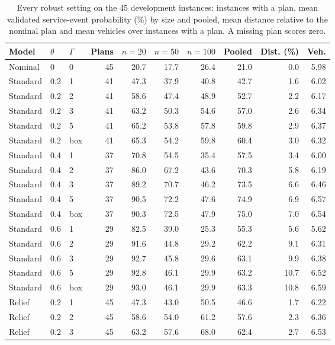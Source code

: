 \begin{table}[htbp]
\centering
\scriptsize
\caption{Every robust setting on the 45 development instances: instances with a plan, mean validated service-event probability (\%) by size and pooled, mean distance relative to the nominal plan and mean vehicles over instances with a plan. A missing plan scores zero.}
\label{tab:robust-grid}
\begin{tabular}{@{}lllrrrrrrr@{}}
\toprule
Model & $\theta$ & $\Gamma$ & Plans & $n=20$ & $n=50$ & $n=100$ & Pooled & Dist. (\%) & Veh.\\
\midrule
Nominal & 0 & 0 & 45 & 20.7 & 17.7 & 26.4 & 21.0 & 0.0 & 5.98\\
Standard & 0.2 & 1 & 41 & 47.3 & 37.9 & 40.8 & 42.7 & 1.6 & 6.02\\
Standard & 0.2 & 2 & 41 & 58.6 & 47.4 & 48.9 & 52.7 & 2.2 & 6.17\\
Standard & 0.2 & 3 & 41 & 63.2 & 50.3 & 54.6 & 57.0 & 2.6 & 6.34\\
Standard & 0.2 & 5 & 41 & 65.2 & 53.8 & 57.8 & 59.8 & 2.9 & 6.37\\
Standard & 0.2 & box & 41 & 65.3 & 54.2 & 59.8 & 60.4 & 3.0 & 6.32\\
Standard & 0.4 & 1 & 37 & 70.8 & 54.5 & 35.4 & 57.5 & 3.4 & 6.00\\
Standard & 0.4 & 2 & 37 & 86.0 & 67.2 & 43.6 & 70.3 & 5.8 & 6.19\\
Standard & 0.4 & 3 & 37 & 89.2 & 70.7 & 46.2 & 73.5 & 6.6 & 6.46\\
Standard & 0.4 & 5 & 37 & 90.5 & 72.2 & 47.6 & 74.9 & 6.9 & 6.57\\
Standard & 0.4 & box & 37 & 90.3 & 72.5 & 47.9 & 75.0 & 7.0 & 6.54\\
Standard & 0.6 & 1 & 29 & 82.5 & 39.0 & 25.3 & 55.3 & 5.6 & 5.62\\
Standard & 0.6 & 2 & 29 & 91.6 & 44.8 & 29.2 & 62.2 & 9.1 & 6.31\\
Standard & 0.6 & 3 & 29 & 92.7 & 45.8 & 29.6 & 63.1 & 9.9 & 6.38\\
Standard & 0.6 & 5 & 29 & 92.8 & 46.1 & 29.9 & 63.2 & 10.7 & 6.52\\
Standard & 0.6 & box & 29 & 93.0 & 46.1 & 29.9 & 63.3 & 10.8 & 6.59\\
Relief & 0.2 & 1 & 45 & 47.3 & 43.0 & 50.5 & 46.6 & 1.7 & 6.22\\
Relief & 0.2 & 2 & 45 & 58.6 & 54.0 & 61.2 & 57.6 & 2.3 & 6.36\\
Relief & 0.2 & 3 & 45 & 63.2 & 57.6 & 68.0 & 62.4 & 2.7 & 6.53\\

\end{tabular}
\end{table}
